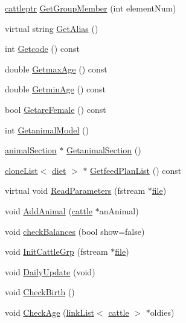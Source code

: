\begin{DoxyCompactItemize}
\item 
\hyperlink{classcattle}{cattleptr} \hyperlink{classcattle_group_a2242557ba924ba92be1cbf0d25b6f422}{GetGroupMember} (int elementNum)
\item 
virtual string \hyperlink{classcattle_group_abc9e83055bbfc774f2cd1900cff76c5b}{GetAlias} ()
\item 
int \hyperlink{classcattle_group_a28dcd27ede1d2e379ac9393fbfe6bf3a}{Getcode} () const 
\item 
double \hyperlink{classcattle_group_ad9430200dcf4bbad6566b60680834a63}{GetmaxAge} () const 
\item 
double \hyperlink{classcattle_group_af902b9fb5f7c68c47a19f2858b96fa6f}{GetminAge} () const 
\item 
bool \hyperlink{classcattle_group_ac312442c56d183c4fff3c6b3a520a54f}{GetareFemale} () const 
\item 
int \hyperlink{classcattle_group_a86e0db44ae65503c4288b8f0f00caa0d}{GetanimalModel} ()
\item 
\hyperlink{classanimal_section}{animalSection} $\ast$ \hyperlink{classcattle_group_a1822e1d26e286df36a7f307e379cc684}{GetanimalSection} ()
\item 
\hyperlink{classclone_list}{cloneList}$<$ \hyperlink{classdiet}{diet} $>$ $\ast$ \hyperlink{classcattle_group_a0eeb9f3381e384d990fbedf6a5fd5b16}{GetfeedPlanList} () const 
\item 
virtual void \hyperlink{classcattle_group_aa82f6f64e7b90b317c8178f11199e0f7}{ReadParameters} (fstream $\ast$\hyperlink{classbase_a3af52ee9891719d09b8b19b42450b6f6}{file})
\item 
void \hyperlink{classcattle_group_ae73c8abf22391b3baee45b5785c20653}{AddAnimal} (\hyperlink{classcattle}{cattle} $\ast$anAnimal)
\item 
void \hyperlink{classcattle_group_a727a18c5ed01a68ab343ec6688f618aa}{checkBalances} (bool show=false)
\item 
void \hyperlink{classcattle_group_a9f984d5505fca52ed79f950bc9c01a78}{InitCattleGrp} (fstream $\ast$\hyperlink{classbase_a3af52ee9891719d09b8b19b42450b6f6}{file})
\item 
void \hyperlink{classcattle_group_a50e5f5559c7f8ae9e0a4163ba0e6d602}{DailyUpdate} (void)
\item 
void \hyperlink{classcattle_group_a8b9c6a787edfd3af498b2637d7447f50}{CheckBirth} ()
\item 
void \hyperlink{classcattle_group_ab90b18a82f05308c895fd72e5d5447c4}{CheckAge} (\hyperlink{classlink_list}{linkList}$<$ \hyperlink{classcattle}{cattle} $>$ $\ast$oldies)

\end{DoxyCompactItemize}
